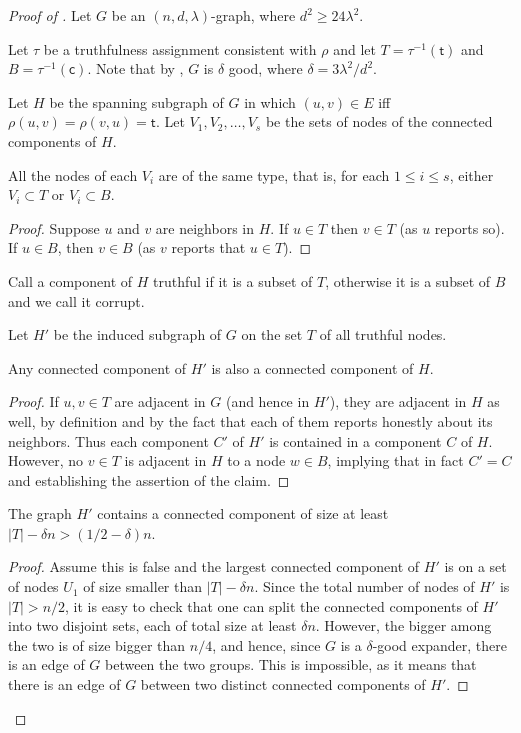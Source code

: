 \documentclass{toc}
\begin{document}
\noindent
%
\begin{proof}[Proof of ]
Let $G$ be an $(n,d,\lambda)$-graph, where
$d^2 \geq 24 \lambda^2$.

Let $\tau$ be a truthfulness assignment consistent with $\rho$ and let $T = \tau^{-1}(\mathsf{t})$ and 
$B = \tau^{-1}(\mathsf{c})$. 
Note that by , $G$ is $\delta$ good, where 
$\delta = 3\lambda^2/d^2$. 

Let $H$ be the spanning  subgraph of $G$ in which $(u,v) \in E$ iff
$\rho(u,v) = \rho(v,u) = \mathsf{t}$. %
%
Let $V_1,V_2, \ldots ,V_s$ 
be the sets of nodes of the connected  components of 
$H$. 
\begin{claim}
\label{c21}
All the nodes of each $V_i$ are of the same type, that is, for
each $1 \leq i \leq s$, either $V_i \subset T$ or $V_i \subset B$.
\end{claim}

\begin{proof} Suppose $u$ and $v$ are neighbors in $H$. If $u \in T$
then $v \in T$ (as $u$ reports so). If $u \in B$, then 
$v \in B$ (as $v$ reports that $u \in T$).
\end{proof}

Call a component of $H$ truthful if it is a subset of $T$, 
%
otherwise   %
it is a subset of $B$ and we call it corrupt. 

Let $H'$ be the induced subgraph of $G$ on the set $T$ of all 
%
truthful  %
nodes.
\begin{claim}
\label{c22}
Any connected component of $H'$ is also a connected component of 
$H$.
\end{claim}

\begin{proof} If $u,v \in T$ are adjacent in $G$ (and hence in
$H'$), they are
adjacent in $H$ as well, by definition and by the fact that each of
them reports honestly about its neighbors. Thus each component $C'$ of
$H'$ is contained in a component $C$ of $H$. However, no
$v \in T$ is adjacent in $H$ to a node $w \in B$, implying
that in fact $C'=C$ and establishing the
assertion of the claim.
\end{proof}

\begin{claim}
\label{c23}
The graph $H'$ contains a connected component of size at least
$|T|-\delta n > (1/2-\delta)n$.
\end{claim}

\begin{proof} Assume this is false and the largest connected component
  of $H'$ is on a set of nodes $U_1$ of size smaller than
  $|T|-\delta n$. Since the total number of nodes of $H'$ is
  $|T|>n/2$, it is easy to check that one can split the connected
  components of $H'$ into two disjoint sets, each of total size at
  least $\delta n$. However, the bigger among the two is of size
  bigger than $n/4$, and hence, since $G$ is a $\delta$-good expander,
  there is an edge of $G$ between the two groups. This is impossible,
  as it means that there is an edge of $G$ between two distinct
  connected components of $H'$.
\end{proof}


\end{proof}
\end{document}
